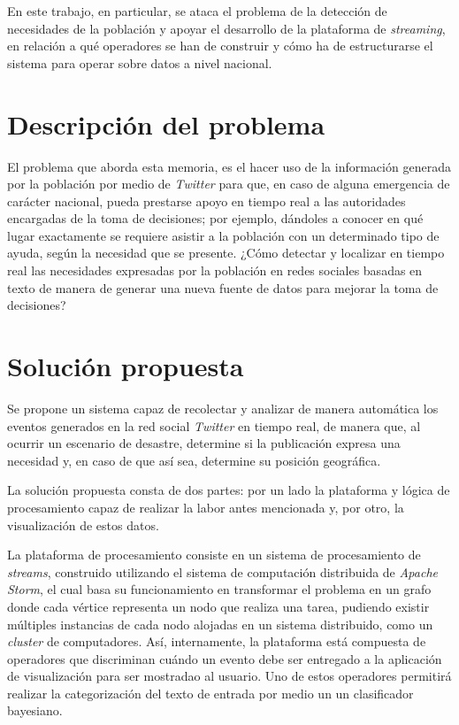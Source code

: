 En este trabajo, en particular, se ataca el problema de la detección de necesidades de la población y apoyar el desarrollo de la plataforma de \textit{streaming}, en relación a qué operadores se han de construir y cómo ha de estructurarse el sistema para operar sobre datos a nivel nacional.

\section{Descripción del problema}
\label{intro:problema}

El problema que aborda esta memoria, es el hacer uso de la información generada por la población por medio de \textit{Twitter} para que, en caso de alguna emergencia de carácter nacional, pueda prestarse apoyo en tiempo real a las autoridades encargadas de la toma de decisiones; por ejemplo, dándoles a conocer en qué lugar exactamente se requiere asistir a la población con un determinado tipo de ayuda, según la necesidad que se presente. ¿Cómo detectar y localizar en tiempo real las necesidades expresadas por la población en redes sociales basadas en texto de manera de generar una nueva fuente de datos para mejorar la toma de decisiones?

\section{Solución propuesta}
\label{intro:solucion}

Se propone un sistema capaz de recolectar y analizar de manera automática los eventos generados en la red social \textit{Twitter} en tiempo real, de manera que, al ocurrir un escenario de desastre, determine si la publicación expresa una necesidad y, en caso de que así sea, determine su posición geográfica. 

La solución propuesta consta de dos partes: por un lado la plataforma y lógica de procesamiento capaz de realizar la labor antes mencionada y, por otro, la visualización de estos datos.

La plataforma de procesamiento consiste en un sistema de procesamiento de \textit{streams}, construido utilizando el sistema de computación distribuida de \textit{Apache Storm}, el cual basa su funcionamiento en transformar el problema en un grafo donde cada vértice representa un nodo que realiza una tarea, pudiendo existir múltiples instancias de cada nodo alojadas en un sistema distribuido, como un \textit{cluster} de computadores. Así, internamente, la plataforma está compuesta de operadores que discriminan cuándo un evento debe ser entregado a la aplicación de visualización para ser mostradao al usuario. Uno de estos operadores permitirá realizar la categorización del texto de entrada por medio un un clasificador bayesiano.

